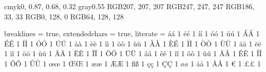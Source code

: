 
\definecolor{maroon}        {cmyk}{0, 0.87, 0.68, 0.32}
\definecolor{halfgray}      {gray}{0.55}
\definecolor{ipython_frame} {RGB}{207, 207, 207}
\definecolor{ipython_bg}    {RGB}{247, 247, 247}
\definecolor{ipython_red}   {RGB}{186, 33, 33}
\definecolor{ipython_green} {RGB}{0, 128, 0}
\definecolor{ipython_cyan}  {RGB}{64, 128, 128}

{
    breaklines = true,
    extendedchars = true,
    literate =
    {á}{{\' a}} 1 {é}{{\' e}} 1 {í}{{\' i}} 1 {ó}{{\' o}} 1 {ú}{{\' u}} 1
    {Á}{{\' A}} 1 {É}{{\' E}} 1 {Í}{{\' I}} 1 {Ó}{{\' O}} 1 {Ú}{{\' U}} 1
    {à}{{\` a}} 1 {è}{{\` e}} 1 {ì}{{\` i}} 1 {ò}{{\` o}} 1 {ù}{{\` u}} 1
    {À}{{\` A}} 1 {È}{{\' E}} 1 {Ì}{{\` I}} 1 {Ò}{{\` O}} 1 {Ù}{{\` U}} 1
    {ä}{{\" a}} 1 {ë}{{\" e}} 1 {ï}{{\" i}} 1 {ö}{{\" o}} 1 {ü}{{\" u}} 1
    {Ä}{{\" A}} 1 {Ë}{{\" E}} 1 {Ï}{{\" I}} 1 {Ö}{{\" O}} 1 {Ü}{{\" U}} 1
    {â}{{\^ a}} 1 {ê}{{\^ e}} 1 {î}{{\^ i}} 1 {ô}{{\^ o}} 1 {û}{{\^ u}} 1
    {Â}{{\^ A}} 1 {Ê}{{\^ E}} 1 {Î}{{\^ I}} 1 {Ô}{{\^ O}} 1 {Û}{{\^ U}} 1
    {œ}{{\oe}}  1 {Œ}{{\OE}}  1 {æ}{{\ae}}  1 {Æ}{{\AE}}  1 {ß}{{\ss}}  1
    {ç}{{\c c}} 1 {Ç}{{\c C}} 1 {ø}{{\o}} 1 {å}{{\r a}} 1 {Å}{{\r A}} 1
    {€}{{\EUR}} 1 {£}{{\pounds}} 1
}



